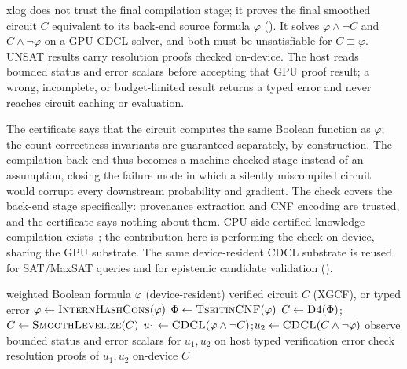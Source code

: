 xlog does not trust the final compilation stage; it proves the final smoothed circuit $C$ equivalent to its back-end source formula $\varphi$ (). It solves $\varphi \land \lnot C$ and $C \land \lnot \varphi$ on a GPU CDCL solver, and both must be unsatisfiable for $C \equiv \varphi$. UNSAT results carry resolution proofs checked on-device. The host reads bounded status and error scalars before accepting that GPU proof result; a wrong, incomplete, or budget-limited result returns a typed error and never reaches circuit caching or evaluation.

The certificate says that the circuit computes the same Boolean function as $\varphi$; the count-correctness invariants are guaranteed separately, by construction. The compilation back-end thus becomes a machine-checked stage instead of an assumption, closing the failure mode in which a silently miscompiled circuit would corrupt every downstream probability and gradient. The check covers the back-end stage specifically: provenance extraction and CNF encoding are trusted, and the certificate says nothing about them. CPU-side certified knowledge compilation exists~\cite{capelli2019}; the contribution here is performing the check on-device, sharing the GPU substrate. The same device-resident CDCL substrate is reused for SAT/MaxSAT queries and for epistemic candidate validation ().

\begin{algorithm}[htbp]
\caption{Verified knowledge compilation. The final smoothed circuit is accepted only if proven equivalent to its back-end source formula.}
\label{alg:verifiedkc}
\begin{algorithmic}[1]
\Require weighted Boolean formula $\varphi$ (device-resident)
\Ensure verified circuit $C$ (XGCF), or typed error
\State $\varphi \gets \textsc{InternHashCons}(\varphi)$ 
\State $\Phi \gets \textsc{TseitinCNF}(\varphi)$ 
\State $C \gets \textsc{D4}(\Phi)$; $C \gets \textsc{SmoothLevelize}(C)$
\State $u_1 \gets \textsc{CDCL}(\varphi \land \lnot C)$;\quad $u_2 \gets \textsc{CDCL}(C \land \lnot \varphi)$
\State observe bounded status and error scalars for $u_1,u_2$ on host
  \State \Return typed verification error
\EndIf
\State check resolution proofs of $u_1, u_2$ on-device
\State \Return $C$ 
\end{algorithmic}
\end{algorithm}

